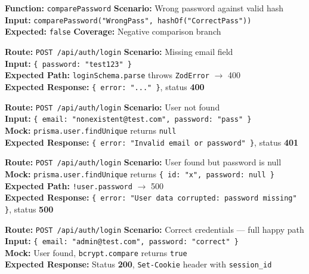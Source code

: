 \documentclass[12pt,a4paper]{report}
\newcommand{\pone}{\textbf{\color{p1red}P1}}
\newcommand{\ptwo}{\textbf{\color{p2orange}P2}}
\begin{document}
\begin{tcolorbox}[testbox,title={AUTH-010 \hfill \pone}]
\textbf{Function:} \texttt{comparePassword} \quad \textbf{Scenario:} Wrong password against valid hash \\
\textbf{Input:} \texttt{comparePassword("WrongPass", hashOf("CorrectPass"))} \\
\textbf{Expected:} \texttt{false} \quad \textbf{Coverage:} Negative comparison branch
\end{tcolorbox}

\begin{tcolorbox}[testbox,title={AUTH-011 \hfill \pone}]
\textbf{Route:} \texttt{POST /api/auth/login} \quad \textbf{Scenario:} Missing email field \\
\textbf{Input:} \texttt{\{ password: "test123" \}} \\
\textbf{Expected Path:} \texttt{loginSchema.parse} throws \texttt{ZodError} $\to$ 400 \\
\textbf{Expected Response:} \texttt{\{ error: "..." \}}, status \textbf{400}
\end{tcolorbox}

\begin{tcolorbox}[testbox,title={AUTH-012 \hfill \pone}]
\textbf{Route:} \texttt{POST /api/auth/login} \quad \textbf{Scenario:} User not found \\
\textbf{Input:} \texttt{\{ email: "nonexistent@test.com", password: "pass" \}} \\
\textbf{Mock:} \texttt{prisma.user.findUnique} returns \texttt{null} \\
\textbf{Expected Response:} \texttt{\{ error: "Invalid email or password" \}}, status \textbf{401}
\end{tcolorbox}

\begin{tcolorbox}[criticalbox,title={AUTH-013 \hfill \ptwo\ --- Corrupted Data}]
\textbf{Route:} \texttt{POST /api/auth/login} \quad \textbf{Scenario:} User found but password is null \\
\textbf{Mock:} \texttt{prisma.user.findUnique} returns \texttt{\{ id: "x", password: null \}} \\
\textbf{Expected Path:} \texttt{!user.password} $\to$ 500 \\
\textbf{Expected Response:} \texttt{\{ error: "User data corrupted: password missing" \}}, status \textbf{500}
\end{tcolorbox}

\begin{tcolorbox}[testbox,title={AUTH-014 \hfill \pone}]
\textbf{Route:} \texttt{POST /api/auth/login} \quad \textbf{Scenario:} Correct credentials --- full happy path \\
\textbf{Input:} \texttt{\{ email: "admin@test.com", password: "correct" \}} \\
\textbf{Mock:} User found, \texttt{bcrypt.compare} returns \texttt{true} \\
\textbf{Expected Response:} Status \textbf{200}, \texttt{Set-Cookie} header with \texttt{session\_id}
\end{tcolorbox}
\end{document}
